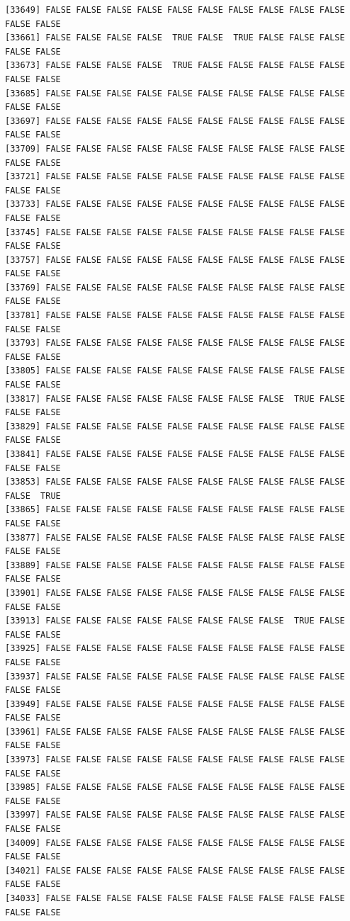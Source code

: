 \documentclass[
  a4paper,
  DIV=11,
  numbers=noendperiod]{scrartcl}
\begin{document}
\begin{verbatim}
[33649] FALSE FALSE FALSE FALSE FALSE FALSE FALSE FALSE FALSE FALSE FALSE FALSE
[33661] FALSE FALSE FALSE FALSE  TRUE FALSE  TRUE FALSE FALSE FALSE FALSE FALSE
[33673] FALSE FALSE FALSE FALSE  TRUE FALSE FALSE FALSE FALSE FALSE FALSE FALSE
[33685] FALSE FALSE FALSE FALSE FALSE FALSE FALSE FALSE FALSE FALSE FALSE FALSE
[33697] FALSE FALSE FALSE FALSE FALSE FALSE FALSE FALSE FALSE FALSE FALSE FALSE
[33709] FALSE FALSE FALSE FALSE FALSE FALSE FALSE FALSE FALSE FALSE FALSE FALSE
[33721] FALSE FALSE FALSE FALSE FALSE FALSE FALSE FALSE FALSE FALSE FALSE FALSE
[33733] FALSE FALSE FALSE FALSE FALSE FALSE FALSE FALSE FALSE FALSE FALSE FALSE
[33745] FALSE FALSE FALSE FALSE FALSE FALSE FALSE FALSE FALSE FALSE FALSE FALSE
[33757] FALSE FALSE FALSE FALSE FALSE FALSE FALSE FALSE FALSE FALSE FALSE FALSE
[33769] FALSE FALSE FALSE FALSE FALSE FALSE FALSE FALSE FALSE FALSE FALSE FALSE
[33781] FALSE FALSE FALSE FALSE FALSE FALSE FALSE FALSE FALSE FALSE FALSE FALSE
[33793] FALSE FALSE FALSE FALSE FALSE FALSE FALSE FALSE FALSE FALSE FALSE FALSE
[33805] FALSE FALSE FALSE FALSE FALSE FALSE FALSE FALSE FALSE FALSE FALSE FALSE
[33817] FALSE FALSE FALSE FALSE FALSE FALSE FALSE FALSE  TRUE FALSE FALSE FALSE
[33829] FALSE FALSE FALSE FALSE FALSE FALSE FALSE FALSE FALSE FALSE FALSE FALSE
[33841] FALSE FALSE FALSE FALSE FALSE FALSE FALSE FALSE FALSE FALSE FALSE FALSE
[33853] FALSE FALSE FALSE FALSE FALSE FALSE FALSE FALSE FALSE FALSE FALSE  TRUE
[33865] FALSE FALSE FALSE FALSE FALSE FALSE FALSE FALSE FALSE FALSE FALSE FALSE
[33877] FALSE FALSE FALSE FALSE FALSE FALSE FALSE FALSE FALSE FALSE FALSE FALSE
[33889] FALSE FALSE FALSE FALSE FALSE FALSE FALSE FALSE FALSE FALSE FALSE FALSE
[33901] FALSE FALSE FALSE FALSE FALSE FALSE FALSE FALSE FALSE FALSE FALSE FALSE
[33913] FALSE FALSE FALSE FALSE FALSE FALSE FALSE FALSE  TRUE FALSE FALSE FALSE
[33925] FALSE FALSE FALSE FALSE FALSE FALSE FALSE FALSE FALSE FALSE FALSE FALSE
[33937] FALSE FALSE FALSE FALSE FALSE FALSE FALSE FALSE FALSE FALSE FALSE FALSE
[33949] FALSE FALSE FALSE FALSE FALSE FALSE FALSE FALSE FALSE FALSE FALSE FALSE
[33961] FALSE FALSE FALSE FALSE FALSE FALSE FALSE FALSE FALSE FALSE FALSE FALSE
[33973] FALSE FALSE FALSE FALSE FALSE FALSE FALSE FALSE FALSE FALSE FALSE FALSE
[33985] FALSE FALSE FALSE FALSE FALSE FALSE FALSE FALSE FALSE FALSE FALSE FALSE
[33997] FALSE FALSE FALSE FALSE FALSE FALSE FALSE FALSE FALSE FALSE FALSE FALSE
[34009] FALSE FALSE FALSE FALSE FALSE FALSE FALSE FALSE FALSE FALSE FALSE FALSE
[34021] FALSE FALSE FALSE FALSE FALSE FALSE FALSE FALSE FALSE FALSE FALSE FALSE
[34033] FALSE FALSE FALSE FALSE FALSE FALSE FALSE FALSE FALSE FALSE FALSE FALSE

\end{verbatim}
\end{document}
